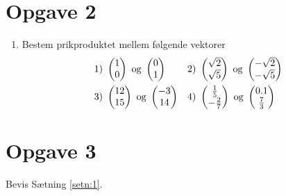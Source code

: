 \section*{Opgave 2}
\begin{enumerate}[label=\roman*)]
\item Bestem prikproduktet mellem følgende vektorer
\begin{align*}
&1) \ \begin{pmatrix}1 \\ 0\end{pmatrix} \textnormal{ og } \begin{pmatrix}0 \\ 1\end{pmatrix}    &&2) \  \begin{pmatrix}\sqrt{2} \\ \sqrt{5}\end{pmatrix} \textnormal{ og } \begin{pmatrix}-\sqrt{2} \\ -\sqrt{5}\end{pmatrix}    \\
&3) \ \begin{pmatrix}12 \\ 15\end{pmatrix} \textnormal{ og } \begin{pmatrix}-3 \\ 14 \end{pmatrix}   &&4) \ \begin{pmatrix}\frac{1}{5} \\ -\frac{2}{7}\end{pmatrix} \textnormal{ og } \begin{pmatrix} 0.1 \\ \frac{7}{3}\end{pmatrix}     \\
\end{align*}
\end{enumerate}

\section*{Opgave 3}
Bevis Sætning \ref{setn:1}.
